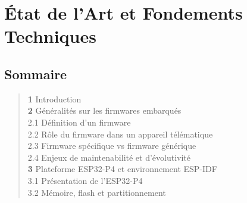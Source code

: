 
\chapter{État de l'Art et Fondements Techniques }

\section*{Sommaire}
\begin{quote}
\small
\textbf{1} \hspace{1em} Introduction \dotfill \pageref{sec:intro_ch2}\\
\textbf{2} \hspace{1em} Généralités sur les firmwares embarqués \dotfill \pageref{sec:generalites}\\
\hspace{2.5em} 2.1 \hspace{0.5em} Définition d'un firmware \dotfill \pageref{subsec:def_fw}\\
\hspace{2.5em} 2.2 \hspace{0.5em} Rôle du firmware dans un appareil télématique \dotfill \pageref{subsec:role_fw}\\
\hspace{2.5em} 2.3 \hspace{0.5em} Firmware spécifique vs firmware générique \dotfill \pageref{subsec:specifique_vs_generique}\\
\hspace{2.5em} 2.4 \hspace{0.5em} Enjeux de maintenabilité et d'évolutivité \dotfill \pageref{subsec:maintenabilite}\\
\textbf{3} \hspace{1em} Plateforme ESP32-P4 et environnement ESP-IDF \dotfill \pageref{sec:esp32}\\
\hspace{2.5em} 3.1 \hspace{0.5em} Présentation de l'ESP32-P4 \dotfill \pageref{subsec:esp32p4}\\
\hspace{2.5em} 3.2 \hspace{0.5em} Mémoire, flash et partitionnement \dotfill \pageref{subsec:memoire}\\

\end{quote}
